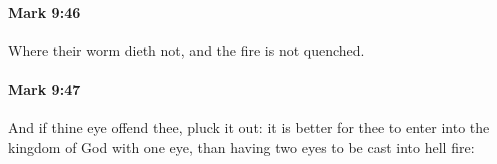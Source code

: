 		\paragraph{Mark 9:46} %
			\label{MARK-9-46}

			Where their worm dieth not, and the fire is not quenched.

			\begin{framed}
			\scriptsize
				\begin{compactdesc}
					\item[SBLG] \gr{---}
				\end{compactdesc}
			\end{framed}

		\paragraph{Mark 9:47} %
			\label{MARK-9-47}

			And if thine eye offend thee, pluck it out: it is better for thee to enter into the kingdom of God with one eye, than having two eyes to be cast into hell fire:

